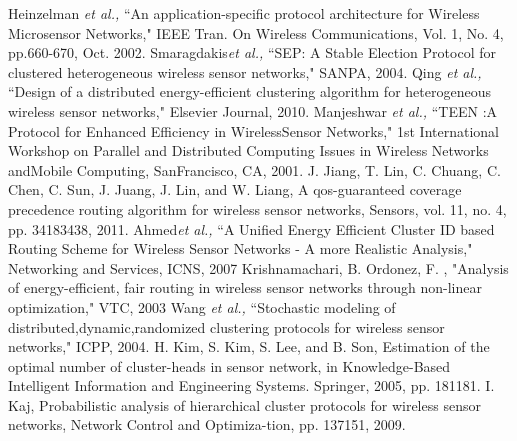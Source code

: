 \documentclass[10pt, conference, compsocconf]{IEEEtran}
\begin{document}
\begin{thebibliography}{1}
Heinzelman \textit{et al.,}  ``An application-specific protocol architecture for Wireless Microsensor Networks," IEEE Tran. On Wireless
Communications, Vol. 1, No. 4, pp.660-670, Oct. 2002.
Smaragdakis\textit{et al.,} ``SEP: A Stable Election Protocol for clustered heterogeneous wireless sensor networks,"  SANPA, 2004.
Qing \textit{et al.,}  ``Design of a distributed energy-efficient clustering algorithm for heterogeneous wireless sensor networks,"  Elsevier Journal, 2010.
Manjeshwar \textit{et al.,}  ``TEEN :A Protocol for Enhanced Efficiency in WirelessSensor Networks," 1st International Workshop on Parallel and Distributed Computing Issues in Wireless Networks andMobile Computing, SanFrancisco, CA, 2001.
J. Jiang, T. Lin, C. Chuang, C. Chen, C. Sun, J. Juang, J. Lin, and W. Liang, A qos-guaranteed coverage precedence routing algorithm for wireless sensor networks, Sensors, vol. 11, no. 4, pp. 34183438, 2011.
Ahmed\textit{et al.,} ``A Unified Energy Efficient Cluster ID based Routing Scheme for Wireless Sensor Networks - A more Realistic Analysis," Networking and Services, ICNS, 2007
Krishnamachari, B. Ordonez, F. , "Analysis of energy-efficient, fair routing in wireless sensor networks through non-linear optimization,"  VTC, 2003
Wang \textit{et al.,} ``Stochastic modeling of distributed,dynamic,randomized clustering protocols for wireless sensor networks," ICPP, 2004.
H. Kim, S. Kim, S. Lee, and B. Son, Estimation of the optimal number of cluster-heads in sensor network, in Knowledge-Based Intelligent Information and Engineering Systems. Springer, 2005, pp. 181181.
I. Kaj, Probabilistic analysis of hierarchical cluster protocols for wireless sensor networks, Network Control and Optimiza-tion, pp. 137151, 2009.

\end{thebibliography}
\end{document}

